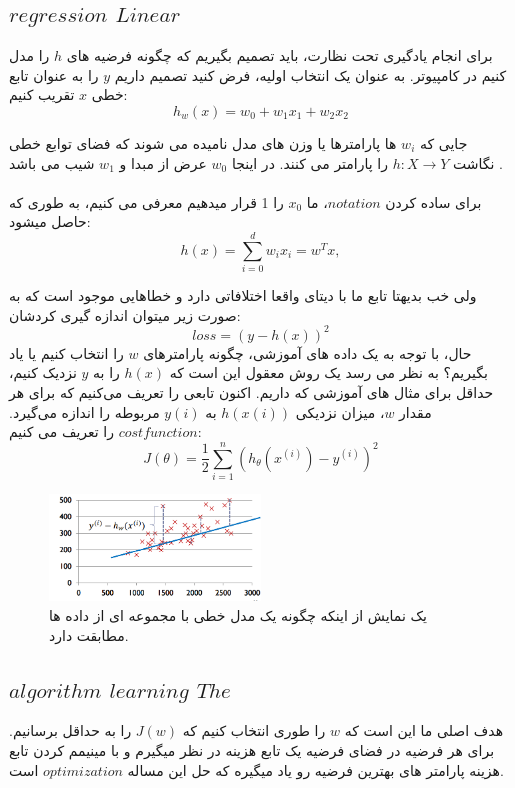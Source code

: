 \documentclass[12pt]{article}
\begin{document}
\subsection*{$regression$ $Linear$}
برای انجام یادگیری تحت نظارت، باید تصمیم بگیریم که چگونه فرضیه های $h$ را مدل کنیم در کامپیوتر. به عنوان یک انتخاب اولیه، فرض کنید تصمیم داریم $y$ را به عنوان تابع خطی $x$ تقریب کنیم:
\\
\[
h_w(x) = w_0 + w_1x_1 + w_2x_2
\]

جایی که $w_i$ ها پارامترها یا وزن های مدل نامیده می شوند که فضای توابع خطی نگاشت $h : X\longrightarrow Y$ را پارامتر می کنند. در اینجا $w_0$ عرض از مبدا و 
$w_1$
شیب می باشد .
\\
\\
برای ساده کردن $notation$، ما $x_0$ را 1 قرار میدهیم  معرفی می کنیم، به طوری که حاصل میشود:
\[
h(x)=\sum_{i=0}^{d}{w}_{i}x_{i}={w}^{T}x,
\]

ولی خب بدیهتا تابع ما با دیتای واقعا اختلافاتی دارد و خطاهایی موجود است که به صورت زیر میتوان اندازه گیری کردشان:
\[
loss = (y - h(x))^2
\]
حال، با توجه به یک داده های آموزشی، چگونه پارامترهای $w$ را انتخاب کنیم یا یاد بگیریم؟ به نظر می رسد یک روش معقول این است که $h(x)$ را به $y$ نزدیک کنیم، حداقل برای مثال های آموزشی که داریم. اکنون تابعی را تعریف می‌کنیم که برای هر مقدار $w$، میزان نزدیکی $h(x(i))$ به $y(i)$ مربوطه را اندازه می‌گیرد. $cost function$ را تعریف می کنیم:
\[
J(\theta)=\frac{1}{2}\sum_{i=1}^{n}(h_{\theta}(x^{(i)})-y^{(i)})^{2}
\]

\begin{figure}[htbp]
  \centering
  \includegraphics[width=0.5\textwidth]{etc/Images/Fig4.png} 
  \caption{یک نمایش از اینکه چگونه یک مدل خطی با مجموعه ای از داده ها مطابقت دارد.}
  \label{fig4}
\end{figure}

\subsection*{$algorithm$ $learning$  $The$}
هدف اصلی ما این است که $w$ را طوری انتخاب کنیم که $J(w)$ را به حداقل برسانیم.
 برای هر فرضیه در فضای فرضیه یک تابع هزینه در نظر میگیرم و با مینیمم کردن تابع هزینه پارامتر های بهترین فرضیه رو یاد میگیره که حل این مساله $optimization$ است.
\end{document}
